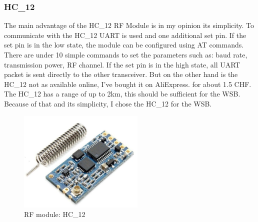 \subsubsection{HC\_12} 
The main advantage of the HC\_12 RF Module is in my opinion its simplicity. To communicate with the HC\_12 UART is used and one additional set pin. If the set pin is in the low state, the module can be configured using AT commands. There are under 10 simple commands to set the parameters such as: baud rate, transmission power, RF channel. If the set pin is in the high state, all UART packet is sent directly to the other transceiver. But on the other hand is the HC\_12 not as available online, I've bought it on AliExpress. for about 1.5 CHF. The HC\_12 has a range of up to 2km, this should be sufficient for the WSB. Because of that and its simplicity, I chose the HC\_12 for the WSB.
\cite{HC_12_doc}
\begin{figure}[H]
	\centering
	\includegraphics[width=6cm]{2_Documentation/Documentation_Wireless_ScoreBoard_Remote/Resources/HC12.jpg}
	\caption{RF module: HC\_12}
	\label{fig:HC_12}
\end{figure}

